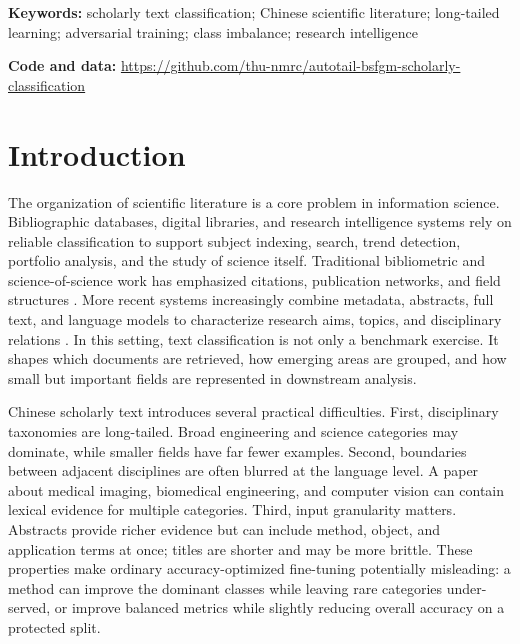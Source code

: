 \documentclass[10pt]{article}
\begin{document}
\noindent\textbf{Keywords:} scholarly text classification; Chinese scientific literature; long-tailed learning; adversarial training; class imbalance; research intelligence

\noindent\textbf{Code and data:} \url{https://github.com/thu-nmrc/autotail-bsfgm-scholarly-classification}

\section{Introduction}

The organization of scientific literature is a core problem in information science. Bibliographic databases, digital libraries, and research intelligence systems rely on reliable classification to support subject indexing, search, trend detection, portfolio analysis, and the study of science itself. Traditional bibliometric and science-of-science work has emphasized citations, publication networks, and field structures \citep{garfield1972citation,narin1976evaluative,bornmann2015growth,fortunato2018science}. More recent systems increasingly combine metadata, abstracts, full text, and language models to characterize research aims, topics, and disciplinary relations \citep{wu2025scaling,beltagy2019scibert,lo2020s2orc}. In this setting, text classification is not only a benchmark exercise. It shapes which documents are retrieved, how emerging areas are grouped, and how small but important fields are represented in downstream analysis.

Chinese scholarly text introduces several practical difficulties. First, disciplinary taxonomies are long-tailed. Broad engineering and science categories may dominate, while smaller fields have far fewer examples. Second, boundaries between adjacent disciplines are often blurred at the language level. A paper about medical imaging, biomedical engineering, and computer vision can contain lexical evidence for multiple categories. Third, input granularity matters. Abstracts provide richer evidence but can include method, object, and application terms at once; titles are shorter and may be more brittle. These properties make ordinary accuracy-optimized fine-tuning potentially misleading: a method can improve the dominant classes while leaving rare categories under-served, or improve balanced metrics while slightly reducing overall accuracy on a protected split.
\end{document}
